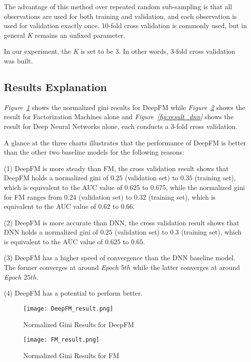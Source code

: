 \documentclass{article}
\begin{document}
    The advantage of this method over repeated random sub-sampling is that all observations are used for both training and validation, and each observation is used for validation exactly once. 10-fold cross validation is commonly used, but in general \emph{K} remains an unfixed parameter.~\cite{mc04:kfold}

    In our experiment, the \emph{K} is set to be 3. In other words, 3-fold cross validation was built.

    \subsection{Results Explanation}
    \emph{Figure~\ref{fig:result_deepfm}} shows the normalized gini results for DeepFM while \emph{Figure~\ref{fig:result_fm}} shows the result for Factorization Machines alone and \emph{Figure~\ref{fig:result_dnn}} shows the result for Deep Neural Networks alone, each conducts a 3-fold cross validation. 

    A glance at the three charts illustrates that the performance of DeepFM is better than the other two baseline models for the following reasons:

    (1) DeepFM is more steady than FM, the cross validation result shows that DeepFM holds a normalized gini of $0.25$ (validation set) to $0.35$ (training set), which is equivalent to the AUC value of $0.625$ to $0.675$, while the normalized gini for FM ranges from $0.24$ (validation set) to $0.32$ (training set), which is equivalent to the AUC value of $0.62$ to $0.66$.

    (2) DeepFM is more accurate than DNN, the cross validation result shows that DNN holds a normalized gini of $0.25$ (validation set) to $0.3$ (training set), which is equivalent to the AUC value of $0.625$ to $0.65$.

    (3) DeepFM has a higher speed of convergence than the DNN baseline model. The former converges at around \emph{Epoch $5th$} while the latter converges at around \emph{Epoch $25th$}.

    (4) DeepFM has a potential to perform better.    

    \begin{figure}[!h]
		\centering
		\texttt{[image: DeepFM\_result.png]}
		\caption{\small{Normalized Gini Results for DeepFM}}
		\label{fig:result_deepfm}
	\end{figure}

	\begin{figure}[!h]
		\centering
		\texttt{[image: FM\_result.png]}
		\caption{\small{Normalized Gini Results for FM}}
		\label{fig:result_fm}
	\end{figure}
\end{document}
